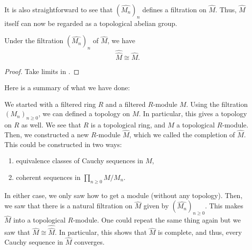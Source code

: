 It is also straightforward to see that $(\widehat{M_{n}})_{n}$ defines a filtration on $\widehat{M}$. Thus, $\widehat{M}$ itself can now be regarded as a topological abelian group.

\begin{cor}
	Under the filtration $(\widehat{M_{n}})_{n}$ of $\widehat{M}$, we have
	\begin{equation*} 
		\widehat{\widehat{M}} \cong \widehat{M}.
	\end{equation*}
\end{cor}
\begin{proof} 
	Take limits in .
\end{proof}

\begin{disc}
	Here is a summary of what we have done:

	We started with a filtered ring $R$ and a filtered $R$-module $M$. \newline
	Using the filtration $(M_{n})_{n \ge 0}$, we can defined a topology on $M$. In particular, this gives a topology on $R$ as well. \newline
	We see that $R$ is a topological ring, and $M$ a topological $R$-module. \newline
	Then, we constructed a new $R$-module $\widehat{M}$, which we called the completion of $\widehat{M}$. This could be constructed in two ways:
	\begin{enumerate}
	 	\item equivalence classes of Cauchy sequences in $M$,
	 	\item coherent sequences in $\prod_{n \ge 0} M/M_{n}$.
	 \end{enumerate}
	 In either case, we only saw how to get a module (without any topology). Then, we saw that there is a natural filtration on $\widehat{M}$ given by $(\widehat{M_{n}})_{n \ge 0}$. \newline
	 This makes $\widehat{M}$ into a topological $R$-module. One could repeat the same thing again but we saw that $\widehat{M} \cong \widehat{\widehat{M}}$. In particular, this shows that $\widehat{M}$ is complete, and thus, every Cauchy sequence in $\widehat{M}$ converges.
\end{disc}

